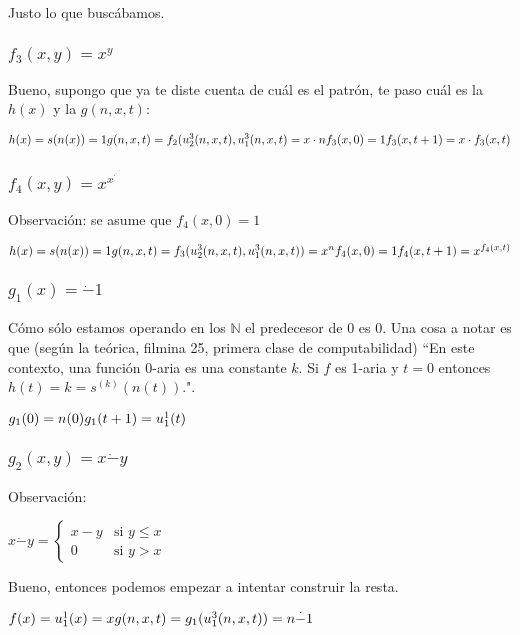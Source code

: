 \documentclass[11pt]{article} %
\newcommand{\desarrollo}[1]{

    \hspace{2em}
    \begin{minipage}{\textwidth}
        #1
    \end{minipage}

}
\newcommand{\nat}{\mathbb{N}}
\begin{document}
Justo lo que buscábamos.

\subsubsection{$f_3(x,y)=x^y$}

Bueno, supongo que ya te diste cuenta de cuál es el patrón, te paso cuál es la $h(x)$ y la $g(n,x,t)$:
\desarrollo{$
h(x)     = s(n(x)) = 1 \\
g(n,x,t) = f_2(u^3_2(n,x,t), u^3_1(n,x,t) = x \cdot n \\
\\
f_3(x,0)   = 1 \\
f_3(x,t+1) = x \cdot f_3(x,t)
$}

\subsubsection{$f_4(x,y)=x^{x^{\cdot^{\cdot^{\cdot^{^{x}}}}}}$}

Observación: se asume que $f_4(x,0)=1$
\desarrollo{$
h(x) = s(n(x)) = 1 \\
g(n,x,t) = f_3(u^3_2(n,x,t),u^3_1(n,x,t)) = x^n \\
\\
f_4(x,0) = 1 \\
f_4(x,t+1) = x^{f_4(x,t)}
$}

\subsubsection{$g_1(x)=\dot-1$}

Cómo sólo estamos operando en los $\nat$ el predecesor de 0 es 0. Una cosa a notar es que (según la teórica, filmina 25, primera clase de computabilidad) ``En este contexto, una función 0-aria es una constante $k$. Si $f$ es 1-aria y $t=0$ entonces $h(t)=k=s^{(k)}(n(t))$.".
\desarrollo{$
g_1(0) = n(0)\\
g_1(t+1) = u^1_1(t)
$}

\subsubsection{$g_2(x,y)=x\dot-y$}

Observación:
\desarrollo{$
x\dot-y =
\begin{cases}
  x - y & \text{si } y \le x \\
  0     & \text{si } y > x
\end{cases}
$}

Bueno, entonces podemos empezar a intentar construir la resta.
\desarrollo{$
f(x) = u^1_1(x) = x \\
g(n, x, t) = g_1(u^3_1(n,x,t)) = n \dot- 1
$}
\end{document}
